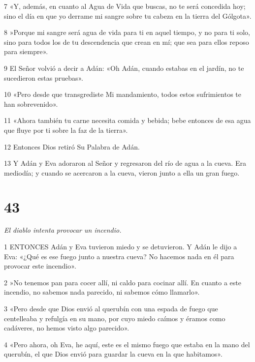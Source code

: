 \par 7 «Y, además, en cuanto al Agua de Vida que buscas, no te será concedida hoy; sino el día en que yo derrame mi sangre sobre tu cabeza en la tierra del Gólgota».

\par 8 »Porque mi sangre será agua de vida para ti en aquel tiempo, y no para ti solo, sino para todos los de tu descendencia que crean en mí; que sea para ellos reposo para siempre».

\par 9 El Señor volvió a decir a Adán: «Oh Adán, cuando estabas en el jardín, no te sucedieron estas pruebas».

\par 10 «Pero desde que transgrediste Mi mandamiento, todos estos sufrimientos te han sobrevenido».

\par 11 «Ahora también tu carne necesita comida y bebida; bebe entonces de esa agua que fluye por ti sobre la faz de la tierra».

\par 12 Entonces Dios retiró Su Palabra de Adán.

\par 13 Y Adán y Eva adoraron al Señor y regresaron del río de agua a la cueva. Era mediodía; y cuando se acercaron a la cueva, vieron junto a ella un gran fuego.

\chapter{43}

\par \textit{El diablo intenta provocar un incendio.}

\par 1 ENTONCES Adán y Eva tuvieron miedo y se detuvieron. Y Adán le dijo a Eva: «¿Qué es ese fuego junto a nuestra cueva? No hacemos nada en él para provocar este incendio».

\par 2 »No tenemos pan para cocer allí, ni caldo para cocinar allí. En cuanto a este incendio, no sabemos nada parecido, ni sabemos cómo llamarlo».

\par 3 «Pero desde que Dios envió al querubín con una espada de fuego que centelleaba y refulgía en su mano, por cuyo miedo caímos y éramos como cadáveres, no hemos visto algo parecido».

\par 4 «Pero ahora, oh Eva, he aquí, este es el mismo fuego que estaba en la mano del querubín, el que Dios envió para guardar la cueva en la que habitamos».

